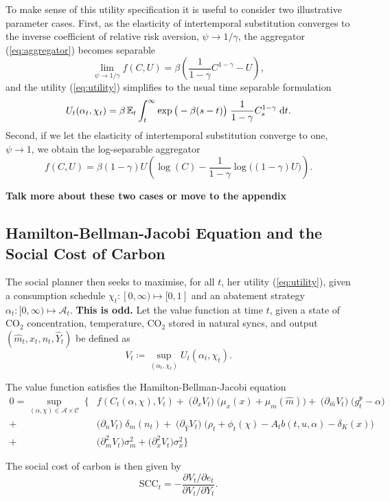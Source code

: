 \documentclass[../../main.tex]{subfiles}
\begin{document}
To make sense of this utility specification it is useful to consider two illustrative parameter cases. First, as the elasticity of intertemporal substitution converges to the inverse  coefficient of relative risk aversion, $\psi \to 1 / \gamma$, the aggregator (\ref{eq:aggregator}) becomes separable \begin{equation}
    \lim_{\psi \to 1 / \gamma} f(C, U) = \beta \left(\frac{1}{1 - \gamma} C^{1 - \gamma} - U\right),
\end{equation} and the utility (\ref{eq:utility}) simplifies to the usual time separable formulation \begin{equation}
    U_t(\alpha_t, \chi_t) = \beta\operatorname{\mathbb{E}}_t \int^{\infty}_t \exp\big(-\beta (s - t) \big) \; \frac{1}{1 - \gamma} C_s^{1 - \gamma} \; \mathrm{d}t.
\end{equation} Second, if we let the elasticity of intertemporal substitution converge to one, $\psi \to 1$, we obtain the log-separable aggregator \begin{equation}
    f(C, U) = \beta (1-  \gamma)U \left(\log(C) - \frac{1}{1 - \gamma} \log\big( (1 - \gamma) U \big) \right).
\end{equation}

\textbf{Talk more about these two cases or move to the appendix}

\subsection{Hamilton-Bellman-Jacobi Equation and the Social Cost of Carbon}

The social planner then seeks to maximise, for all $t$, her utility (\ref{eq:utility}), given a consumption schedule $\chi_t: [0, \infty) \mapsto \mathcal [0, 1]$ and an abatement strategy $\alpha_t: [0, \infty) \mapsto \mathcal{A}_t$. \textbf{This is odd.} Let the value function at time $t$, given a state of CO$_2$ concentration, temperature, CO$_2$ stored in natural syncs, and output $(\hat m_t, x_t, n_t, \hat Y_t)$ be defined as \begin{equation}
    V_t \coloneqq \sup_{(\alpha_t, \chi_t)} U_t(\alpha_t, \chi_t).
\end{equation}

\begin{proposition}
    The value function satisfies the Hamilton-Bellman-Jacobi equation \begin{equation}
        \begin{split}
            0 = \sup_{(\alpha, \chi) \in \mathcal{A} \times \mathcal{C}} \; \Bigg\{&f\left(C_t(\alpha, \chi), V_t\right) + \; \big(\partial_x V_t \big) \; \Big(\mu_x(x) + \mu_{m}(\hat m) \Big) + \; \big(\partial_{\hat m} V_t \big) \; \Big(g^{\mathtt{P}}_t - \alpha \Big) \\
            + \; &\Big(\partial_{n} V_t\Big) \; \delta_m(n_t) + \; \Big(\partial_{\hat Y} V_t \Big) \; \Big(\rho_t + \phi_t(\chi) - A_t b(t, u, \alpha) - \delta_K(x) \Big) \\
            + \; &\Big(\partial^2_{m} V_t\Big) \sigma^2_m + \Big(\partial^2_{x} V_t\Big) \sigma^2_x  \Bigg\}
        \end{split}
    \end{equation}
\end{proposition}

The social cost of carbon is then given by \begin{equation}
    \text{SCC}_t = - \frac{\partial V_t / \partial e_t}{\partial V_t / \partial Y_t}. 
\end{equation}
\end{document}

